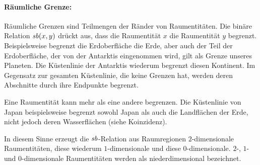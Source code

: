  \paragraph{Räumliche Grenze:}
        Räumliche
        Grenzen sind Teilmengen der Ränder von Raumentitäten.
        Die binäre Relation $\mathit{sb}(x,y)$ drückt aus, dass die Raumentität $x$ die Raumentität $y$ begrenzt. 
        Beispielsweise begrenzt die Erdoberfläche die Erde, aber auch der Teil der Erdoberfläche, der von der Antarktis eingenommen wird, gilt als Grenze unseres Planeten.
        Die Küstenlinie der Antarktis wiederum begrenzt diesen Kontinent.
        Im Gegensatz zur gesamten Küstenlinie, die keine Grenzen hat, werden deren Abschnitte durch ihre Endpunkte begrenzt.
        
        Eine Raumentität kann mehr als eine andere begrenzen. Die Küstenlinie von Japan beispielsweise begrenzt sowohl Japan als auch die Landflächen der Erde, nicht jedoch deren Wasserflächen (siehe Koinzidenz).
        
        In diesem Sinne erzeugt die $\mathit{sb}$-Relation aus Raumregionen $2$-dimensionale Raumentitäten, diese wiederum $1$-dimensionale und diese $0$-dimensionale.
        $2$-, $1$- und $0$-dimensionale Raumentitäten werden als niederdimensional bezeichnet.
        
%  

